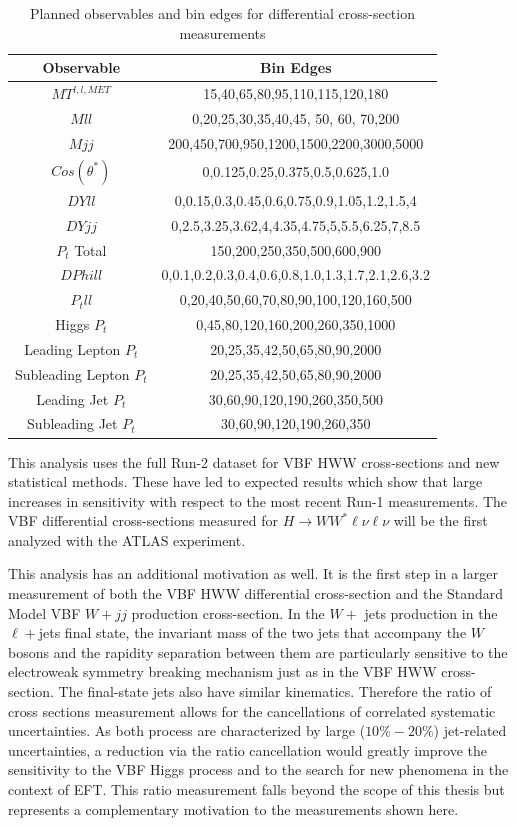 \begin{table}[h!]
\begin{center}
\begin{tabular}{ |c||c|  }
 \hline
 Observable & Bin Edges\\
 \hline
 $MT^{l,l,MET}$ &15,40,65,80,95,110,115,120,180\\
 $Mll$&  0,20,25,30,35,40,45, 50, 60, 70,200\\
 $Mjj$ &200,450,700,950,1200,1500,2200,3000,5000\\
 $Cos(\theta^{*})$ &0,0.125,0.25,0.375,0.5,0.625,1.0\\
 $DYll$&   0,0.15,0.3,0.45,0.6,0.75,0.9,1.05,1.2,1.5,4\\
 $DYjj$& 0,2.5,3.25,3.62,4,4.35,4.75,5,5.5,6.25,7,8.5\\
 $P_{t}$ Total& 150,200,250,350,500,600,900\\
 $DPhill$& 0,0.1,0.2,0.3,0.4,0.6,0.8,1.0,1.3,1.7,2.1,2.6,3.2\\
 $P_{t} ll$&0,20,40,50,60,70,80,90,100,120,160,500\\
 Higgs $P_{t}$&0,45,80,120,160,200,260,350,1000\\
 Leading Lepton $P_{t}$&20,25,35,42,50,65,80,90,2000\\
 Subleading Lepton $P_{t}$&20,25,35,42,50,65,80,90,2000\\
 Leading Jet $P_{t}$&30,60,90,120,190,260,350,500\\
 Subleading Jet $P_{t}$& 30,60,90,120,190,260,350\\
 \hline
\end{tabular}
\end{center}
\caption{Planned observables and bin edges for differential cross-section measurements}
\label{tab:observablebins}
\end{table}

This analysis uses the full Run-2 dataset for VBF HWW cross-sections and new statistical methods. These have led to expected results which show that large increases in sensitivity with respect to the most recent Run-1 measurements. The VBF differential cross-sections measured for $H\rightarrow WW^*\ell\nu\ell\nu$ will be the first analyzed with the ATLAS experiment. 

This analysis has an additional motivation as well. It is the first step in a larger measurement of both the VBF HWW differential cross-section and the Standard Model VBF $W+jj$ production cross-section. In the $W+$ jets production in the $\ell+$jets final state, the invariant mass of the two jets that accompany the $W$ bosons and the rapidity separation between them are particularly sensitive to the electroweak symmetry breaking mechanism just as in the VBF HWW cross-section. The final-state jets also have similar kinematics. Therefore the ratio of cross sections measurement allows for the cancellations of correlated systematic uncertainties. As both process are characterized by large ($10\%-20\%$) jet-related uncertainties, a reduction via the ratio cancellation would greatly improve the sensitivity to the VBF Higgs process and to the search for new phenomena in the context of EFT. This ratio measurement falls beyond the scope of this thesis but represents a complementary motivation to the measurements shown here. 

